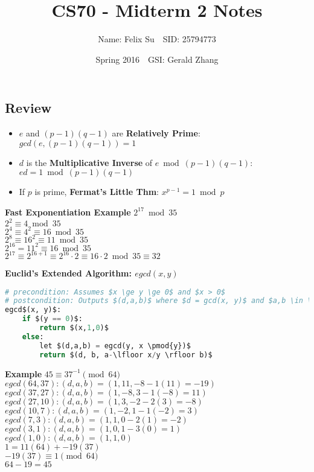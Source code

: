 \documentclass{article}\usepackage{amsmath,amssymb,amsthm,tikz,tkz-graph,color,chngpage,soul,hyperref,csquotes,graphicx,floatrow, listings,polynom}\newcommand*{\QEDB}{\hfill\ensuremath{\square}}\newtheorem*{prop}{Proposition}\renewcommand{\theenumi}{\alph{enumi}}\usepackage[shortlabels]{enumitem}\usepackage[nobreak=true]{mdframed}\usetikzlibrary{matrix,calc}\MakeOuterQuote{"}\usepackage[margin=0.75in]{geometry} \newtheorem{theorem}{Theorem}\newcommand{\Z}{\mathbb Z}\newcommand{\R}{\mathbb R}\newcommand{\Q}{\mathbb Q}\newcommand{\N}{\mathbb N}\newcommand{\x}[1]{\textrm{ #1 }}\newcommand{\pr}{\textrm{Pr}}
\title{CS70 - Midterm 2 Notes}
\author{Name: Felix Su$\quad$SID: 25794773}
\date{Spring 2016$\quad$GSI: Gerald Zhang}
\begin{document}
\maketitle

\subsection*{Review}
\begin{itemize}
    \item $e$ and $(p - 1)(q - 1)$ are \textbf{Relatively Prime}: $gcd(e,(p - 1)(q - 1)) = 1$
    \item $d$ is the \textbf{Multiplicative Inverse} of $e \bmod (p-1)(q-1)$: $ed = 1 \bmod (p-1)(q-1)$
    \item If $p$ is prime, \textbf{Fermat's Little Thm}: $x^{p-1} = 1 \bmod p$
\end{itemize}
\begin{mdframed}
\textbf{Fast Exponentiation Example}
$2^{17} \bmod 35$\\
$2^2 \equiv 4	\bmod	35$\\
$2^4 \equiv 4^2 \equiv 16 \bmod 35$\\
$2^8 \equiv 16^2 \equiv 11 \bmod 35$\\
$2^{16} = 11^2 \equiv 16 \bmod 35$\\
$2^{17} \equiv 2^{16+1} \equiv 2^{16} \cdot 2 \equiv 16\cdot2 \bmod 35 \equiv 32$
\end{mdframed}
\begin{mdframed}
\textbf{Euclid's Extended Algorithm: $egcd(x,y)$}
\begin{lstlisting}[language=Python, mathescape=true]
# precondition: Assumes $x \ge y \ge 0$ and $x > 0$
# postcondition: Outputs $(d,a,b)$ where $d = gcd(x, y)$ and $a,b \in \Z$ with $d = ax+by$
egcd$(x, y)$:
    if $(y == 0)$:
        return $(x,1,0)$
    else:
        let $(d,a,b) = egcd(y, x \pmod{y})$
        return $(d, b, a-\lfloor x/y \rfloor b)$
\end{lstlisting}
\textbf{Example}
$45 \equiv 37^{-1} \pmod{64}$\\
$egcd(64, 37) : (d,a,b) = (1, 11,  -8 - 1(11) = -19)$\\
$egcd(37, 27) : (d,a,b) = (1, -8, 3 - 1(-8) = 11)$\\
$egcd(27, 10) : (d,a,b) = (1, 3, -2 - 2(3) = -8)$\\
$egcd(10, 7) : (d,a,b) = (1, -2, 1 - 1(-2) = 3)$\\
$egcd(7, 3) : (d,a,b) = (1, 1, 0 - 2(1) = -2)$\\
$egcd(3, 1) : (d,a,b) = (1, 0,  1 - 3(0) = 1)$\\
$egcd(1, 0) : (d,a,b) = (1, 1, 0)$\\
$1 = 11(64) + -19(37)$\\
$-19(37) \equiv 1 \pmod{64}$\\
$64 - 19 = 45$
\end{mdframed}
\end{document}
